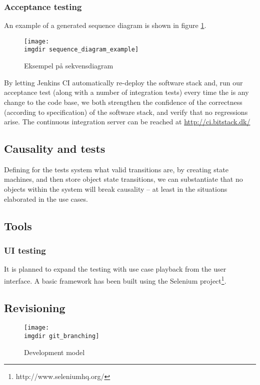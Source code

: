 \subsubsection{Acceptance testing}
An example of a generated sequence diagram is shown in figure \ref{fig:sequence_diagram_example}.
\begin{figure}[ht]
\centering
\texttt{[image: \\imgdir sequence\_diagram\_example]}
\caption{Eksempel på sekvensdiagram}
\label{fig:sequence_diagram_example}
\end{figure}
By letting Jenkins CI automatically re-deploy the software stack and, run our acceptance test (along with a number of integration tests) every time the is any change to the code base, we both strengthen the confidence of the correctness (according to specification) of the software stack, and verify that no regressions arise. The continuous integration server can be reached at \url{http://ci.bitstack.dk/}


\subsection{Causality and tests}
Defining for the tests system what valid transitions are, by creating state machines, and then store object state transitions, we can substantiate that no objects within the system will break causality -- at least in the situations elaborated in the use cases.

\subsection{Tools}


\subsubsection{UI testing}
It is planned to expand the testing with use case playback from the user interface. A basic framework has been built using the Selenium project\footnote{http://www.seleniumhq.org/}.

\subsection{Revisioning}
\begin{figure}[ht]
\centering
\texttt{[image: \\imgdir git\_branching]}
\caption{Development model}
\label{fig:git_branching}
\end{figure}

